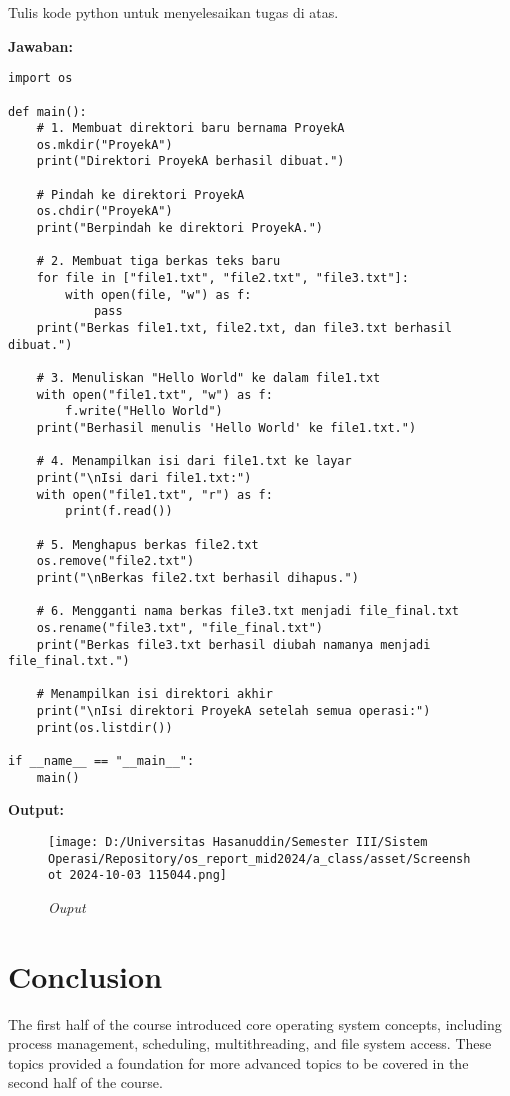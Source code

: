 \documentclass[12pt]{article}
\begin{document}
Tulis kode python untuk menyelesaikan tugas di atas.

\textbf{Jawaban:}

\begin{lstlisting}
import os

def main():
    # 1. Membuat direktori baru bernama ProyekA
    os.mkdir("ProyekA")
    print("Direktori ProyekA berhasil dibuat.")
    
    # Pindah ke direktori ProyekA
    os.chdir("ProyekA")
    print("Berpindah ke direktori ProyekA.")

    # 2. Membuat tiga berkas teks baru
    for file in ["file1.txt", "file2.txt", "file3.txt"]:
        with open(file, "w") as f:
            pass
    print("Berkas file1.txt, file2.txt, dan file3.txt berhasil dibuat.")
    
    # 3. Menuliskan "Hello World" ke dalam file1.txt
    with open("file1.txt", "w") as f:
        f.write("Hello World")
    print("Berhasil menulis 'Hello World' ke file1.txt.")
    
    # 4. Menampilkan isi dari file1.txt ke layar
    print("\nIsi dari file1.txt:")
    with open("file1.txt", "r") as f:
        print(f.read())
    
    # 5. Menghapus berkas file2.txt
    os.remove("file2.txt")
    print("\nBerkas file2.txt berhasil dihapus.")
    
    # 6. Mengganti nama berkas file3.txt menjadi file_final.txt
    os.rename("file3.txt", "file_final.txt")
    print("Berkas file3.txt berhasil diubah namanya menjadi file_final.txt.")
    
    # Menampilkan isi direktori akhir
    print("\nIsi direktori ProyekA setelah semua operasi:")
    print(os.listdir())
    
if __name__ == "__main__":
    main()
\end{lstlisting}

\newpage
\textbf{Output:}
\begin{figure}[h]
    \centering
    \texttt{[image: D:/Universitas Hasanuddin/Semester III/Sistem Operasi/Repository/os\_report\_mid2024/a\_class/asset/Screenshot 2024-10-03 115044.png]}
    \caption{\textit{Ouput}}
    
\end{figure}

\section{Conclusion}
The first half of the course introduced core operating system concepts, including process management, scheduling, multithreading, and file system access. These topics provided a foundation for more advanced topics to be covered in the second half of the course.
\end{document}
